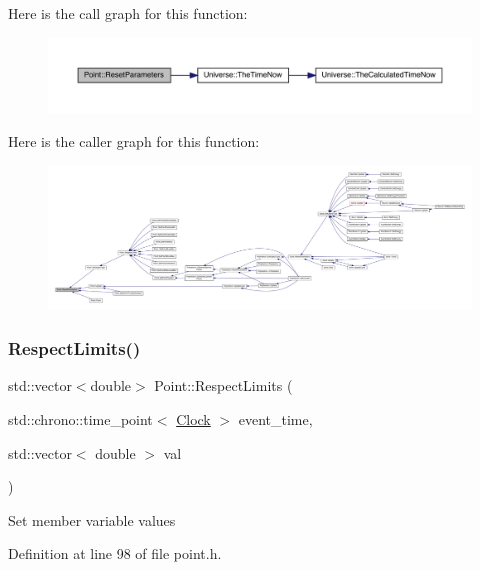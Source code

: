 Here is the call graph for this function\+:
\nopagebreak
\begin{figure}[H]
\begin{center}
\leavevmode
\includegraphics[width=350pt]{class_point_a123c78bef71f74d71bc833709a38709c_cgraph}
\end{center}
\end{figure}
Here is the caller graph for this function\+:
\nopagebreak
\begin{figure}[H]
\begin{center}
\leavevmode
\includegraphics[width=350pt]{class_point_a123c78bef71f74d71bc833709a38709c_icgraph}
\end{center}
\end{figure}
\mbox{\label{class_point_ac3e94cb7e2ab1d6008ff1d5df00641c2}} 
\subsubsection{\texorpdfstring{Respect\+Limits()}{RespectLimits()}}
{\footnotesize\ttfamily std\+::vector$<$double$>$ Point\+::\+Respect\+Limits (\begin{DoxyParamCaption}\item[{std\+::chrono\+::time\+\_\+point$<$ \hyperlink{universe_8h_a0ef8d951d1ca5ab3cfaf7ab4c7a6fd80}{Clock} $>$}]{event\+\_\+time,  }\item[{std\+::vector$<$ double $>$}]{val }\end{DoxyParamCaption})\hspace{0.3cm}{\ttfamily [inline]}}

Set member variable values 

Definition at line 98 of file point.\+h.


